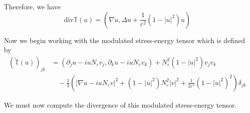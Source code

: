 \documentclass[a4paper]{article}
\renewcommand{\div}{\mathrm{div}}
\begin{document}
Therefore, we have
\begin{equation}
  \div \mathbb{T}(u) = (\nabla u, \Delta u + \frac{1}{\varepsilon^2} (1-|u|^2)u)
  \label{eqn:div_stress_energy}
\end{equation}

Now we begin working with the modulated stress-energy tensor which is defined by
\begin{align}
  (\tilde{\mathbb{T}}(u))_{jk} &= ( \partial_j u - i u N_\varepsilon v_j, \partial_k u - iu N_\varepsilon v_k) + N_\varepsilon^2(1-|u|^2)v_j v_k
  \nonumber \\
  &\quad - \frac{1}{2} \left( |\nabla u - iu N_\varepsilon v|^2 + (1-|u|^2) N_\varepsilon^2 |v|^2 + \frac{1}{2 \varepsilon^2} (1-|u|^2)^2 \right) \delta_{jk}
  \label{eqn:mod_stress_energy}
\end{align}

We must now compute the divergence of this modulated stress-energy tensor.
\end{document}
